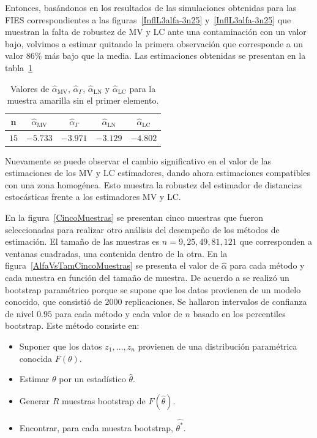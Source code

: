 Entonces, basándonos en los resultados de las simulaciones obtenidas para las FIES correspondientes a las figuras~\ref{InflL3alfa-3n25} y~\ref{InflL3alfa-3n25} que muestran la falta de robustez de MV y LC ante una contaminación con un valor bajo, volvimos a estimar quitando la primera observación que corresponde a un valor $86\%$ más bajo que la media. Las estimaciones obtenidas se presentan en la tabla~\ref{SinPrimero}
\begin{table}[htb]
	\centering
	\caption{\label{SinPrimero} Valores de $\widehat{\alpha}_{\text{MV}}$, $\widehat{\alpha}_{\Gamma}$, $\widehat{\alpha}_{\text{LN}}$ y $\widehat{\alpha}_{\text{LC}}$ para la muestra amarilla sin el primer elemento.}
	\begin{tabular}{c*4{c}}
		\toprule
		                n    &  $\widehat{\alpha}_{\text{MV}}$    &  $\widehat{\alpha}_{\Gamma}$  &  $\widehat{\alpha}_{\text{LN}}$ &  $\widehat{\alpha}_{\text{LC}}$\\
		\midrule
		               $15$  & $-5.733$   & $-3.971$    & $-3.129$    & $-4.802$\\
		\bottomrule
	\end{tabular}
\end{table}
 
Nuevamente se puede observar el cambio significativo en el valor de las estimaciones de los MV y LC estimadores, dando ahora estimaciones compatibles con una zona homogénea. Esto muestra la robustez del estimador de distancias estocásticas frente a los estimadores MV y LC.

En la figura~\ref{CincoMuestras} se presentan cinco muestras que fueron seleccionadas para realizar otro análisis del desempeño de los métodos de estimación. El tamaño de las muestras es $n=9,25,49,81,121$ que corresponden a ventanas cuadradas, una contenida dentro de la otra. En la figura~\ref{AlfaVsTamCincoMuestras} se presenta el valor de $\widehat{\alpha}$ para cada método y cada muestra en función del tamaño de muestra. De acuerdo a \citet{Davison1997} se realizó un bootstrap paramétrico porque se supone que los datos provienen de un modelo conocido, que consistió de $2000$ replicaciones. Se hallaron intervalos de confianza de nivel $0.95$ para cada método y cada valor de $n$ basado en los percentiles bootstrap. Este método consiste en:
\begin{itemize}
	\item Suponer que los datos $z_1,\ldots,z_n$ provienen de una distribución paramétrica conocida $F(\theta)$.
	\item Estimar $\theta$ por un estadístico $\widehat{\theta}$.
	\item Generar $R$ muestras bootstrap de $F(\widehat{\theta})$.
	\item Encontrar, para cada muestra bootstrap, $\widehat{\theta^*}$.
\end{itemize}


